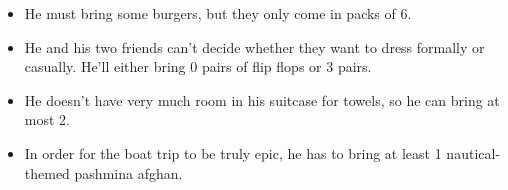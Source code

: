 \documentclass[12pt]{article}
\begin{document}
\begin{itemize}

\item He must bring some burgers, but they only come in packs of 6.

\item He and his two friends can't decide whether they want to dress formally or
casually.  He'll either bring 0 pairs of flip flops or 3 pairs.

\item He doesn't have very much room in his suitcase for towels, so he can
  bring at most 2.

\item In order for the boat trip to be truly epic, he has to bring at least 1
nautical-themed pashmina afghan.

\end{itemize}
\end{document}
